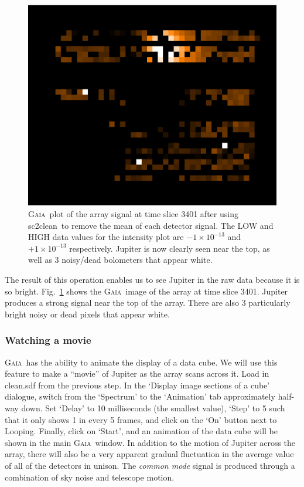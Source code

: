 \documentclass[twoside,11pt]{article}
\newcommand{\gaia}{\xref{\textsc{Gaia}}{sun214}{}}
\newcommand{\task}[1]{\textsf{#1}}
\newcommand{\clean}{\xref{\task{sc2clean}}{sun258}{SC2CLEAN}}
\newcommand{\xref}[3]{#1}
\newcommand{\xlabel}[1]{}
\renewcommand{\_}{\texttt{\symbol{95}}}
\begin{document}
\begin{figure}
\begin{center}
\includegraphics[width=0.5\linewidth]{array_mean.eps}
\caption{\gaia\ plot of the array signal at time slice 3401 after
  using \clean\ to remove the mean of each detector signal. The LOW
  and HIGH data values for the intensity plot are $-1\times10^{-13}$
  and $+1\times10^{-13}$ respectively. Jupiter is now clearly seen
  near the top, as well as 3 noisy/dead bolometers that appear white.}
\label{fig:array_mean}
\end{center}
\end{figure}

The result of this operation enables us to see Jupiter in the raw data
because it is so bright. Fig.~\ref{fig:array_mean} shows the \gaia\
image of the array at time slice 3401. Jupiter produces a strong
signal near the top of the array. There are also 3 particularly bright
noisy or dead pixels that appear white. 

\subsubsection{\xlabel{movie}Watching a movie} 

\gaia\ has the ability to animate the display of a data cube. We will
use this feature to make a ``movie'' of Jupiter as the array scans
across it. Load in clean.sdf from the previous step. In the `Display
image sections of a cube' dialogue, switch from the `Spectrum' to the
`Animation' tab approximately half-way down.  Set `Delay' to 10
milliseconds (the smallest value), `Step' to 5 such that it only shows
1 in every 5 frames, and click on the `On' button next to
Looping. Finally, click on `Start', and an animation of the data cube
will be shown in the main \gaia\ window. In addition to the motion of
Jupiter across the array, there will also be a very apparent gradual
fluctuation in the average value of all of the detectors in
unison. The {\em common mode} signal is produced through a combination
of sky noise and telescope motion.
\end{document}
